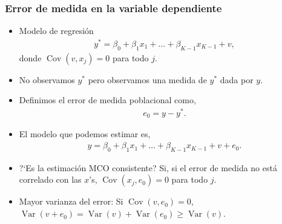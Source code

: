 \documentclass[t, compress, spanish, aspectratio=169]{beamer}
\newcommand{\compactmath}{\setlength{\abovedisplayskip}{3pt}\setlength{\belowdisplayskip}{3pt}\setlength{\abovedisplayshortskip}{0pt}\setlength{\belowdisplayshortskip}{2pt}\setlength{\jot}{1pt}} %
\DeclareMathOperator{\Var}{Var}
\DeclareMathOperator{\Cov}{Cov}
\begin{document}
\begin{frame}\compactmath
    \frametitle{Error de medida en la variable dependiente}
    \footnotesize\compactmath
    \begin{itemize}  
        \item Modelo de regresi\'on
        \begin{align*}
            y^* = \beta_0 + \beta_1 x_{1}+\dots+ \beta_{K-1} x_{K-1}+v,
        \end{align*}
        donde $\Cov(v, x_{j})=0$ para todo $j$.
        \item No observamos $y^*$ pero observamos una medida de $y^*$ dada por $y$.
        \item Definimos el error de medida poblacional como,
        \begin{align*}
            e_{0} = y-y^*.
        \end{align*}
        \item [] El modelo que podemos estimar es,
        \begin{align*}
            y = \beta_0 + \beta_1 x_{1}+\dots+ \beta_{K-1} x_{K-1}+v+e_{0}.
        \end{align*}
        \item ?`Es la estimaci\'on MCO consistente? Si, si el error de medida no est\'a correlado con las $x$'s, $\Cov(x_{j},e_{0})=0$ para todo $j$.
        \item Mayor varianza del error: Si $\Cov(v, e_{0})=0$, $\Var(v+e_{0})=\Var(v)+\Var(e_{0})\geq \Var(v)$.    
        \end{itemize}
\end{frame}
\end{document}
